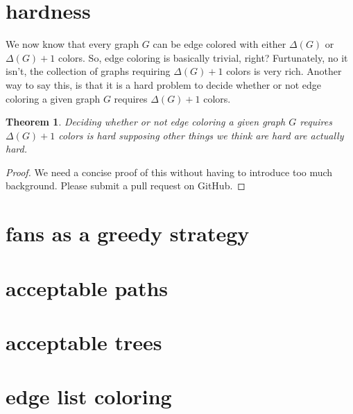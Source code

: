 \documentclass{amsbook}
\theoremstyle{plain}
\newtheorem{theorem}{Theorem}
\numberwithin{equation}{chapter}
\begin{document}
\section*{hardness}
We now know that every graph $G$ can be edge colored with either $\Delta(G)$ or $\Delta(G) + 1$ colors.  So, edge coloring is basically trivial, right?
Furtunately, no it isn't, the collection of graphs requiring $\Delta(G) + 1$ colors is very rich.  Another way to say this, is that it is a hard problem
to decide whether or not edge coloring a given graph $G$ requires $\Delta(G) + 1$ colors.  

\begin{theorem}
Deciding whether or not edge coloring a given graph $G$ requires $\Delta(G) + 1$ colors is hard supposing other things we think are hard are actually hard.
\end{theorem}
\begin{proof}
We need a concise proof of this without having to introduce too much background.  Please submit a pull request on GitHub.
\end{proof}

\section*{fans as a greedy strategy}
\section*{acceptable paths}
\section*{acceptable trees}
\section*{edge list coloring}
\end{document}
